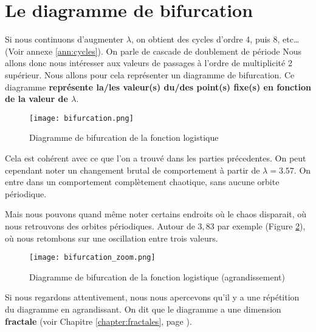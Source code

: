 \newpage
\section{Le diagramme de bifurcation}
Si nous continuons d'augmenter $\lambda$, on obtient des cycles d'ordre 4, puis 8, etc\dots (Voir annexe \ref{ann:cycles}). On parle de cascade de doublement de période
Nous allons donc nous intéresser aux valeurs de passages à l'ordre de multiplicité 2 supérieur. Nous allons pour cela représenter un diagramme de bifurcation. Ce diagramme \textbf{représente la/les valeur(s) du/des point(s) fixe(s) en fonction de la valeur de $\lambda$}.

\begin{figure}[!ht]
    \begin{center}
        \texttt{[image: bifurcation.png]}
    \end{center}
    \caption{\label{fig:bifurcation}Diagramme de bifurcation de la fonction logistique}
\end{figure}

Cela est cohérent avec ce que l'on a trouvé dans les parties précedentes. On peut cependant noter un changement brutal de comportement à partir de $\lambda = 3.57$. On entre dans un comportement complètement chaotique, sans aucune orbite périodique.

Mais nous pouvons quand même noter certains endroits où le chaos disparait, où nous retrouvons des orbites périodiques. Autour de $3,83$ par exemple (Figure \ref{fig:bifurcation_zoom}), où nous retombons sur une oscillation entre trois valeurs. 

\begin{figure}[!ht]
    \begin{center}
        \texttt{[image: bifurcation\_zoom.png]}
    \end{center}
    \caption{\label{fig:bifurcation_zoom}Diagramme de bifurcation de la fonction logistique (agrandissement)}
\end{figure}

Si nous regardons attentivement, nous nous apercevons qu'il y a une répétition du diagramme en agrandissant. On dit que le diagramme a une dimension \textbf{fractale} (voir Chapitre \ref{chapter:fractales}, page \pageref{chapter:fractales}).